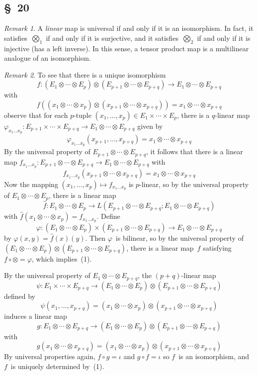 \documentclass[letterpaper,12pt]{article}
\newcommand{\after}{\circ}
\newcommand{\tprod}{\otimes}
\newcommand{\bigtprod}{\bigotimes}
\newcommand{\medtprod}{{\textstyle\bigtprod}}
\newcommand{\multi}[4]{#2_{#3}#1\cdots#1#2_{#4}}
\newcommand{\timess}[3]{\multi{\times}{#1}{#2}{#3}}
\newcommand{\tprods}[3]{\multi{\tprod}{#1}{#2}{#3}}
\theoremstyle{definition}
\theoremstyle{remark}
\newtheorem*{rmk}{Remark}
\begin{document}
\subsection*{\S~20}
\begin{rmk}
A \emph{linear} map is universal if and only if it is an isomorphism. In fact, it satisfies~\(\medtprod_1\) if and only if it is surjective, and it satisfies~\(\medtprod_2\) if and only if it is injective (has a left inverse). In this sense, a tensor product map is a multilinear analogue of an isomorphism.
\end{rmk}

\begin{rmk}
To see that there is a unique isomorphism
\[f:(\tprods{E}{1}{p})\tprod(\tprods{E}{p+1}{p+q})\to\tprods{E}{1}{p+q}\]
with
\[f((\tprods{x}{1}{p})\tprod(\tprods{x}{p+1}{p+q}))=\tprods{x}{1}{p+q}\tag{1}\]
observe that for each \(p\)-tuple \((x_1,\ldots,x_p)\in\timess{E}{1}{p}\), there is a \(q\)-linear map \(\varphi_{x_1\ldots x_p}:\timess{E}{p+1}{p+q}\to\tprods{E}{1}{p+q}\) given by
\[\varphi_{x_1\ldots x_p}(x_{p+1},\ldots,x_{p+q})=\tprods{x}{1}{p+q}\]
By the universal property of \(\tprods{E}{p+1}{p+q}\), it follows that there is a linear map \(f_{x_1\ldots x_p}:\tprods{E}{p+1}{p+q}\to\tprods{E}{1}{p+q}\) with
\[f_{x_1\ldots x_p}(\tprods{x}{p+1}{p+q})=\tprods{x}{1}{p+q}\]
Now the mapping \((x_1,\ldots,x_p)\mapsto f_{x_1\ldots x_p}\) is \(p\)-linear, so by the universal property of \(\tprods{E}{1}{p}\), there is a linear map
\[\widehat{f}:\tprods{E}{1}{p}\to L(\tprods{E}{p+1}{p+q};\tprods{E}{1}{p+q})\]
with \(\widehat{f}(\tprods{x}{1}{p})=f_{x_1\ldots x_p}\). Define
\[\varphi:(\tprods{E}{1}{p})\times(\tprods{E}{p+1}{p+q})\to\tprods{E}{1}{p+q}\]
by \(\varphi(x,y)=\widehat{f}(x)(y)\). Then \(\varphi\)~is bilinear, so by the universal property of \((\tprods{E}{1}{p})\tprod(\tprods{E}{p+1}{p+q})\), there is a linear map~\(f\) satisfying \(f\after\tprod=\varphi\), which implies~(1).

By the universal property of \(\tprods{E}{1}{p+q}\), the \((p+q)\)-linear map
\[\psi:\timess{E}{1}{p+q}\to(\tprods{E}{1}{p})\tprod(\tprods{E}{p+1}{p+q})\]
defined by
\[\psi(x_1,\ldots,x_{p+q})=(\tprods{x}{1}{p})\tprod(\tprods{x}{p+1}{p+q})\]
induces a linear map
\[g:\tprods{E}{1}{p+q}\to(\tprods{E}{1}{p})\tprod(\tprods{E}{p+1}{p+q})\]
with
\[g(\tprods{x}{1}{p+q})=(\tprods{x}{1}{p})\tprod(\tprods{x}{p+1}{p+q})\]
By universal properties again, \(f\after g=\iota\) and \(g\after f=\iota\) so \(f\)~is an isomorphism, and \(f\)~is uniquely determined by~(1).
\end{rmk}
\end{document}
